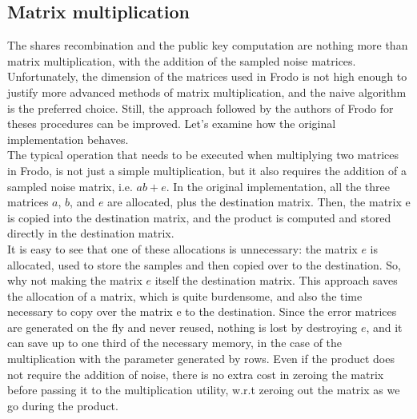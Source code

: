 \subsection{Matrix multiplication}\label{sec:imp:mult}
The shares recombination and the public key computation are nothing more than matrix multiplication, with the addition of the sampled noise matrices. Unfortunately, the dimension of the matrices used in Frodo is not high enough to justify more advanced methods of matrix multiplication, and the naive algorithm is the preferred choice. Still, the approach followed by the authors of Frodo for theses procedures can be improved. Let's examine how the original implementation behaves.\\
The typical operation that needs to be executed when multiplying two matrices in Frodo, is not just a simple multiplication, but it also requires the addition of a sampled noise matrix, i.e. $ab + e$. In the original implementation, all the three matrices $a$, $b$, and $e$ are allocated, plus the destination matrix. Then, the matrix e is copied into the destination matrix, and the product is computed and stored directly in the destination matrix.\\
It is easy to see that one of these allocations is unnecessary: the matrix $e$ is allocated, used to store the samples and then copied over to the destination. So, why not making the matrix $e$ itself the destination matrix. This approach saves the allocation of a matrix, which is quite burdensome, and also the time necessary to copy over the matrix e to the destination. Since the error matrices are generated on the fly and never reused, nothing is lost by destroying $e$, and it can save up to one third of the necessary memory, in the case of the multiplication with the parameter generated by rows. Even if the product does not require the addition of noise, there is no extra cost in zeroing the matrix before passing it to the multiplication utility, w.r.t zeroing out the matrix as we go during the product.\\

